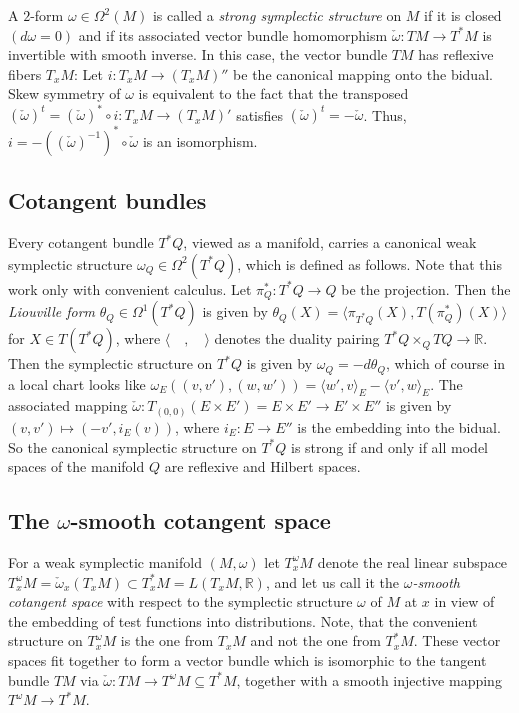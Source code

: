 \documentclass[12pt]{amsart}
\newcommand{\rev}[1]{#1}
\theoremstyle{definition}
\def\th{\theta}
\def\om{\omega}
\def\Om{\Omega}
\def\o{\operatorname{\circ}}
\def\i{^{-1}}
\def\x{\times}
\begin{document}
A $2$-form  $\om\in\Om^2(M)$ is called a 
{\it strong symplectic structure} 
on $M$ if it is closed $(d\om=0)$ and if 
its associated vector bundle homomorphism
$ \check\om: TM \to T^*M$ is invertible with smooth 
inverse. In this case, the vector bundle $TM$ has reflexive fibers 
$T_xM$: Let $i:T_xM\to (T_xM)''$ be the canonical mapping onto the 
bidual. Skew symmetry of $\om$ is equivalent to the fact that the 
transposed $(\check\om)^t=(\check\om)^*\o i:T_xM\to (T_xM)'$ satisfies 
$(\check\om)^t=-\check\om$. Thus, $i=-((\check\om)\i)^*\o  \check\om$  is an 
isomorphism.

\subsection{Cotangent bundles}\label{app:cotangent}
Every cotangent bundle $T^*Q$, viewed as a manifold, carries a 
canonical weak symplectic structure $\om_Q\in\Om^2(T^*Q)$, 
which is defined as follows. Note that this work only with convenient calculus.  
Let 
$\pi_Q^*:T^*Q\to Q$ be the projection. Then the 
{\it Liouville form} $\th_Q\in \Om^1(T^*Q)$ is given by 
$\th_Q(X)=\langle \pi_{T^*Q}(X),T(\pi_Q^*)(X)\rangle $ for  
$X\in T(T^*Q)$,
where $\langle \quad,\quad\rangle$ denotes the duality pairing 
$T^*Q\x_Q TQ\to \mathbb R$. Then the symplectic structure on $T^*Q$ is 
given by $\om_Q = - d\th_Q$, which of course in a local chart looks 
like 
$\om_E((v,v'),(w,w'))=\langle w',v\rangle_E-\langle v',w\rangle_E$.
The associated mapping $ \check\om: T_{(0,0)}(E\x E')=E\x E' 
\to E'\x E''$ is given by $(v,v')\mapsto (-v',i_E(v))$,
where $i_E:E\to E''$ is the embedding into the bidual. 
So the canonical symplectic structure on $T^*Q$ is strong if and only if 
all model spaces of the manifold $Q$ are reflexive and Hilbert spaces. 

\subsection{The $\om$-smooth cotangent space}\label{app:om-cotangent} 
For a weak symplectic manifold $(M,\om)$ 
let $T_x^\om M$ denote the real linear subspace 
$T_x^\om M= \check\om_ x(T_x M) \subset T_x^*M = L(T_x M,\mathbb R)$,
and let us call it the {\it $\om$-smooth cotangent space} with respect to 
the symplectic structure $\om$
of $M$ at $x$ in view of the embedding of test functions
into distributions. \rev{Note, that the convenient structure on $T_x^\om M$ 
is the one from $T_xM$ and not the one from $T_x^*M$.
These vector spaces fit together to form a vector bundle  which 
is isomorphic to the tangent bundle $TM$ via 
$ \check\om: TM\to T^\om M \subseteq T^*M$, together with a smooth injective mapping $T^\om M \to T^*M$. }
\end{document}
